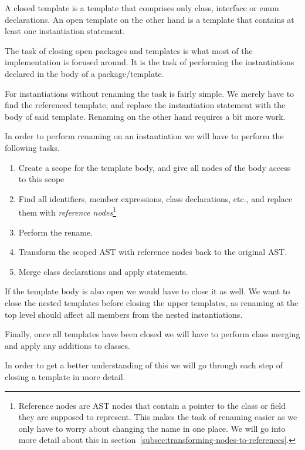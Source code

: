 A closed template is a template that comprises only class, interface or enum declarations.
An open template on the other hand is a template that contains at least one instantiation statement.

The task of closing open packages and templates is what most of the implementation is focused around.
It is the task of performing the instantiations declared in the body of a package/template.

For instantiations without renaming the task is fairly simple.
We merely have to find the referenced template, and replace the instantiation statement with the body of said template.
Renaming on the other hand requires a bit more work.

In order to perform renaming on an instantiation we will have to perform the following tasks.
\begin{enumerate}
    \item Create a scope for the template body, and give all nodes of the body access to this scope
    \item Find all identifiers, member expressions, class declarations, etc., and replace them with \textit{reference nodes}\footnote{Reference nodes are AST nodes that contain a pointer to the class or field they are supposed to represent. This makes the task of renaming easier as we only have to worry about changing the name in one place. We will go into more detail about this in section~\vref{subsec:transforming-nodes-to-references}.}
    \item Perform the rename.
    \item Transform the scoped AST with reference nodes back to the original AST\@.
    \item Merge class declarations and apply  statements.
\end{enumerate}

If the template body is also open we would have to close it as well.
We want to close the nested templates before closing the upper templates, as renaming at the top level should affect all members from the nested instantiations.

Finally, once all templates have been closed we will have to perform class merging and apply any additions to classes.

In order to get a better understanding of this we will go through each step of closing a template in more detail.

